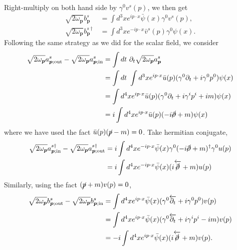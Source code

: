 Right-multiply on both hand side by $\gamma^0 v^{s}(p)$, we then get
\begin{equation}
\begin{aligned}
	\sqrt{2\omega_{\bm p}}b^{s}_{\bm p} &= \int d^3 x e^{ip\cdot x}\bar\psi(x)\gamma^0 v^s(p), \\
	\sqrt{2\omega_{\bm p}}b^{s \dagger}_{\bm p} &= \int d^3 x e^{-ip\cdot x}\bar v^s(p)\gamma^0 \psi(x).
\end{aligned}
\end{equation}
Following the same strategy as we did for the scalar field, we consider
\begin{equation}
\begin{aligned}
	\sqrt{2\omega_{\bm p}}a^{s}_{\bm p;\mathrm{out}} - 
	\sqrt{2\omega_{\bm p}}a^{s}_{\bm p;\mathrm{in}} 
	&= \int dt\ \partial_t \sqrt{2\omega_{\bm p}}a^s_{\bm p} \\
	&= \int dt\ \int d^3x e^{ip\cdot x}\bar u(p)(\gamma^0 \partial_t +i\gamma^0 p^0)\psi(x) \\
	&= \int d^4x e^{ip\cdot x}\bar u(p)(\gamma^0 \partial_t +i\gamma^i p^i +i m)\psi(x) \\ 
	&= i\int d^4x e^{ip\cdot x}\bar u(p)(-i\cancel\partial + m)\psi(x)
\end{aligned}
\end{equation}
where we have used the fact $\bar u(p) (\cancel p - m) = 0$.
Take hermitian conjugate,
\begin{equation}
\begin{aligned}
	\sqrt{2\omega_{\bm p}}a^{s \dagger}_{\bm p;\mathrm{in}} - 
	\sqrt{2\omega_{\bm p}}a^{s \dagger}_{\bm p;\mathrm{out}} 
	&= i\int d^4x e^{-ip\cdot x}\bar\psi(x)\gamma^0(-i\cancel\partial + m)^\dagger \gamma^0 u(p) \\
	&= i\int d^4x e^{-ip\cdot x}\bar\psi(x)(i \overleftarrow{\cancel\partial} + m) u(p)
\end{aligned}
\end{equation}
Similarly, using the fact $(\cancel p + m)v(p) =0$,
\begin{equation}
\begin{aligned}
	\sqrt{2\omega_{\bm p}}b^{s}_{\bm p;\mathrm{out}} - 
	\sqrt{2\omega_{\bm p}}b^{s}_{\bm p;\mathrm{in}} 
	&= \int d^4x e^{ip\cdot x}\bar\psi(x)(\gamma^0 \overleftarrow{\partial_t} +i\gamma^0 p^0)v(p) \\
	&= \int d^4x e^{ip\cdot x}\bar\psi(x)(\gamma^0 \overleftarrow{\partial_t} +i\gamma^i p^i -i m)v(p) \\ 
	&= -i\int d^4x e^{ip\cdot x}\bar\psi(x)(i\overleftarrow{\cancel\partial} + m)v(p).
\end{aligned}
\end{equation}

